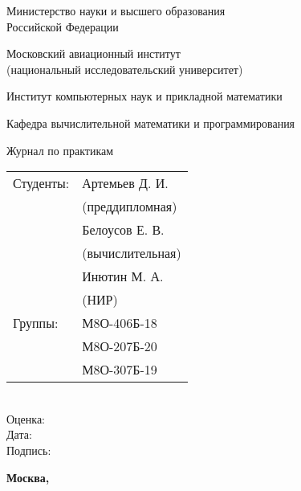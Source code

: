 \documentclass[12pt]{article}
\begin{document}
\begin{titlepage}
\begin{center}
\bfseries

{\Large Министерство науки и высшего образования \\ Российской Федерации}

\vspace{12pt}

{\Large Московский авиационный институт \\ (национальный исследовательский университет)}

\vspace{48pt}

\large Институт компьютерных наук и прикладной математики

\vspace{36pt}

\large Кафедра вычислительной математики и программирования

\vspace{72pt}

Журнал по практикам

\end{center}

\vspace{150pt}

\begin{flushleft}
\hspace{350pt}\begin{tabular}{@{}l l}
Студенты: & Артемьев Д. И. \\
& (преддипломная)\\
& Белоусов Е. В. \\
& (вычислительная)\\
& Инютин М. А. \\
& (НИР)\\
Группы: & М8О-406Б-18 \\
& М8О-207Б-20 \\
& М8О-307Б-19 \\
\end{tabular}\\
\vspace{5pt}
\hspace{350pt} Оценка: \\
\vspace{5pt}
\hspace{350pt} Дата: \\
\vspace{5pt}
\hspace{350pt} Подпись:
\end{flushleft}

\vspace*{\fill}

\begin{center}
\bfseries
Москва, \the\year
\end{center}
\end{titlepage}

\pagebreak








\pagebreak
\end{document}
